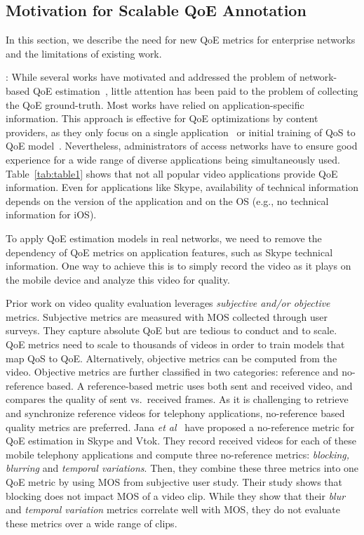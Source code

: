 \subsection{Motivation for Scalable QoE Annotation} \label{MOTIVATION}

In this section, we describe the need for new QoE metrics for enterprise networks and the limitations of existing work. 

:
While several works have motivated and addressed the problem of network-based QoE estimation~\cite{aggarwal2014prometheus}, little attention has been paid to the problem of collecting the QoE ground-truth. Most works have relied on application-specific information. This approach is effective for QoE optimizations by content providers, as they only focus on a single application~\cite{balachandran2013developing} or initial training of QoS to QoE model~\cite{aggarwal2014prometheus}. Nevertheless, administrators of access networks have to ensure good experience for a wide range of diverse applications being simultaneously used. 
Table~\ref{tab:table1} shows that not all popular video applications provide QoE information. 
Even for applications like Skype, availability of technical information depends on the version of the application and on the OS (e.g., no technical information for iOS). 

To apply QoE estimation models in real networks, we need to remove the dependency of QoE metrics on application features, such as Skype technical information. One way to achieve this is to simply record the video as it plays on the mobile device and analyze this video for quality. 

Prior work on video quality evaluation leverages \emph{subjective and/or objective} metrics. 
Subjective metrics are measured with MOS collected through user surveys. 
They capture absolute QoE but are tedious to conduct and to scale. 
QoE metrics need to scale to thousands of videos in order to train models that map QoS to QoE. 
Alternatively, objective metrics can be computed from the video. 
Objective metrics are further classified in two categories: reference and no-reference based. 
A reference-based metric uses both sent and received video, and compares the quality of sent vs.~received frames. 
As it is challenging to retrieve and synchronize reference videos for telephony applications, no-reference based quality metrics are preferred. 
Jana {\em et al}~\cite{jana2016qoe} have proposed a no-reference metric for QoE estimation in Skype and Vtok. 
They record received videos for each of these mobile telephony applications and compute three no-reference metrics: {\em blocking, blurring} and {\em temporal variations}. 
Then, they combine these three metrics into one QoE metric by using MOS from subjective user study. 
Their study shows that blocking does not impact MOS of a video clip. 
While they show that their {\em blur} and {\em temporal variation} metrics correlate well with MOS, they do not evaluate these metrics over a wide range of clips. 


